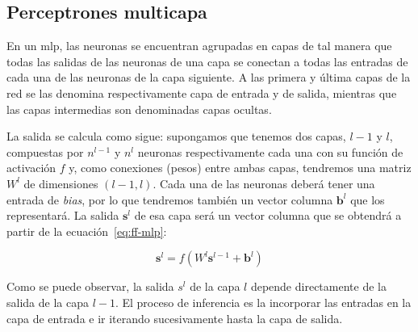 \subsection{Perceptrones multicapa}
\label{ss:mlp}

En un \Acrfull{mlp}, las neuronas se encuentran agrupadas en capas de tal manera que todas las salidas de las neuronas de una capa se conectan a todas las entradas de cada una de las neuronas de la capa siguiente. A las primera y última capas de la red se las denomina respectivamente capa de entrada y de salida, mientras que las capas intermedias son denominadas capas ocultas.

La salida se calcula como sigue: supongamos que tenemos dos capas, $l-1$ y $l$, compuestas por $n^{l-1}$ y $n^l$ neuronas respectivamente cada una con su función de activación $f$ y, como conexiones (pesos) entre ambas capas, tendremos una matriz $W^l$ de dimensiones $(l-1, l)$. Cada una de las neuronas deberá tener una entrada de \textit{bias}, por lo que tendremos también un vector columna $\mathbf{b}^l$ que los representará. La salida $\mathbf{s}^l$ de esa capa será un vector columna que se obtendrá a partir de la ecuación~\ref{eq:ff-mlp}:

\begin{equation}
	\mathbf{s}^l = f(W^l \mathbf{s}^{l-1} + \mathbf{b}^l)
	\label{eq:ff-mlp}
\end{equation}

Como se puede observar, la salida $s^l$ de la capa $l$ depende directamente de la salida de la capa $l - 1$. El proceso de inferencia es la incorporar las entradas en la capa de entrada e ir iterando sucesivamente hasta la capa de salida.

